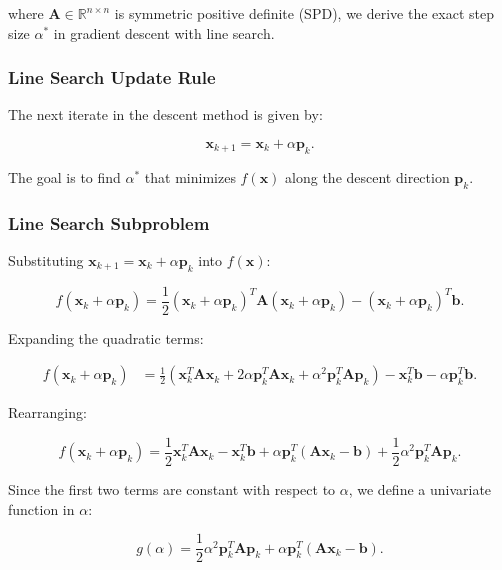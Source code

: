 \documentclass[12pt]{article}
\begin{document}
where \( \mathbf{A} \in \mathbb{R}^{n \times n} \) is symmetric positive definite (SPD), we derive the exact step size \( \alpha^* \) in gradient descent with line search.

\subsubsection{Line Search Update Rule}

The next iterate in the descent method is given by:

\[
\mathbf{x}_{k+1} = \mathbf{x}_k + \alpha \mathbf{p}_k.
\]

The goal is to find \( \alpha^* \) that minimizes \( f(\mathbf{x}) \) along the descent direction \( \mathbf{p}_k \).

\subsubsection{Line Search Subproblem}

Substituting \( \mathbf{x}_{k+1} = \mathbf{x}_k + \alpha \mathbf{p}_k \) into \( f(\mathbf{x}) \):

\[
f(\mathbf{x}_k + \alpha \mathbf{p}_k) = \frac{1}{2} (\mathbf{x}_k + \alpha \mathbf{p}_k)^T \mathbf{A} (\mathbf{x}_k + \alpha \mathbf{p}_k) - (\mathbf{x}_k + \alpha \mathbf{p}_k)^T\mathbf{b}.
\]

Expanding the quadratic terms:

\begin{align*}
f(\mathbf{x}_k + \alpha \mathbf{p}_k) &= \frac{1}{2} \left( \mathbf{x}_k^T \mathbf{A} \mathbf{x}_k + 2\alpha \mathbf{p}_k^T \mathbf{A} \mathbf{x}_k + \alpha^2 \mathbf{p}_k^T \mathbf{A} \mathbf{p}_k \right) - \mathbf{x}_k^T\mathbf{b} - \alpha \mathbf{p}_k^T\mathbf{b}. 
\end{align*}

Rearranging:

\[
f(\mathbf{x}_k + \alpha \mathbf{p}_k) = \frac{1}{2} \mathbf{x}_k^T \mathbf{A} \mathbf{x}_k - \mathbf{x}_k^T\mathbf{b} + \alpha \mathbf{p}_k^T (\mathbf{A} \mathbf{x}_k - \mathbf{b}) + \frac{1}{2} \alpha^2 \mathbf{p}_k^T \mathbf{A} \mathbf{p}_k.
\]

Since the first two terms are constant with respect to \( \alpha \), we define a univariate function in \( \alpha \):

\[
g(\alpha) = \frac{1}{2} \alpha^2 \mathbf{p}_k^T \mathbf{A} \mathbf{p}_k + \alpha \mathbf{p}_k^T (\mathbf{A} \mathbf{x}_k - \mathbf{b}).
\]
\end{document}
